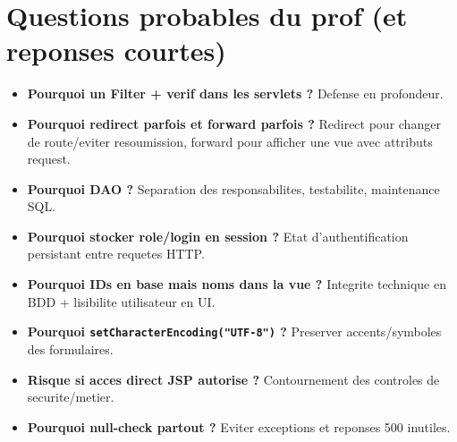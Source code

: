 ﻿\documentclass[11pt,a4paper]{article}
\begin{document}
\section{Questions probables du prof (et reponses courtes)}
\begin{itemize}
  \item \textbf{Pourquoi un Filter + verif dans les servlets ?} Defense en profondeur.
  \item \textbf{Pourquoi redirect parfois et forward parfois ?} Redirect pour changer de route/eviter resoumission, forward pour afficher une vue avec attributs request.
  \item \textbf{Pourquoi DAO ?} Separation des responsabilites, testabilite, maintenance SQL.
  \item \textbf{Pourquoi stocker role/login en session ?} Etat d'authentification persistant entre requetes HTTP.
  \item \textbf{Pourquoi IDs en base mais noms dans la vue ?} Integrite technique en BDD + lisibilite utilisateur en UI.
  \item \textbf{Pourquoi \texttt{setCharacterEncoding("UTF-8")} ?} Preserver accents/symboles des formulaires.
  \item \textbf{Risque si acces direct JSP autorise ?} Contournement des controles de securite/metier.
  \item \textbf{Pourquoi null-check partout ?} Eviter exceptions et reponses 500 inutiles.
\end{itemize}
\end{document}
